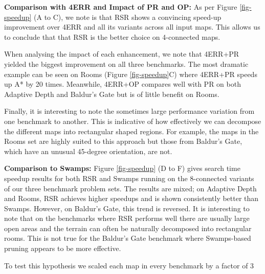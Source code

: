 \par
\textbf{Comparison with 4ERR and Impact of PR and OP:}
As per Figure \ref{fig-speedup} (A to C), we note is that RSR shows a convincing 
speed-up improvement over 4ERR and all its variants across all input maps.
This allows us to conclude that that RSR is the better choice on 4-connected maps.
\par
When analysing the impact of each enhancement, we note that 4ERR+PR yielded the
biggest improvement on all three benchmarks.
The most dramatic example can be seen on Rooms (Figure \ref{fig-speedup}C) 
where 4ERR+PR speeds up A* by 20 times.
Meanwhile, 4ERR+OP compares well with PR on both Adaptive Depth and
Baldur's Gate but is of little benefit on Rooms.
\par
Finally, it is interesting to note the sometimes large performance variation 
from one benchmark to another. This is indicative of how effectively we can 
decompose the different maps into rectangular shaped regions.
For example, the maps in the Rooms set are highly suited to this approach but those
from Baldur's Gate, which have an unusual 45-degree orientation, are not.
\par
\textbf{Comparison to Swamps:}
Figure \ref{fig-speedup} (D to F) gives search time speedup results for both RSR
and Swamps running on the 8-connected variants of our three benchmark problem
sets.  The results are mixed; on Adaptive Depth and Rooms, RSR achieves higher
speedups and is shown consistently better than Swamps. However, on Baldur's
Gate, this trend is reversed.  
It is interesting to note that on the
benchmarks where RSR performs well there are usually large open areas and the
terrain can often be naturally decomposed into rectangular rooms.  This is not
true for the Baldur's Gate benchmark where Swamps-based pruning appears to be
more effective.
\par
To test this hypothesis we scaled each map in every benchmark by a factor of 3
